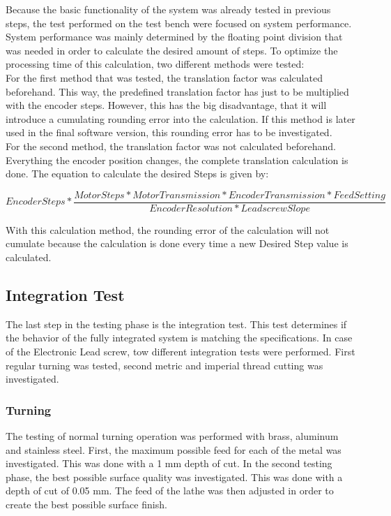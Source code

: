 Because the basic functionality of the system was already tested in previous steps, the test performed on the test bench were focused on system performance. System performance was mainly determined by the floating point division that was needed in order to calculate the desired amount of steps. To optimize the processing time of this calculation, two different methods were tested:\\
 
For the first method that was tested, the translation factor was calculated beforehand. This way, the predefined translation factor has just to be multiplied with the encoder steps. However, this has the big disadvantage, that it will introduce a cumulating rounding error into the calculation. If this method is later used in the final software version, this rounding error has to be investigated.\\
 
For the second method, the translation factor was not calculated beforehand. Everything the encoder position changes, the complete translation calculation is done. The equation to calculate the desired Steps is given by:
 
\begin{equation}
    Encoder Steps * \frac{ Motor Steps * Motor Transmission * Encoder Transmission * Feed Setting}{Encoder Resolution * Lead screw Slope}
\end{equation}
 
With this calculation method, the rounding error of the calculation will not cumulate because the calculation is done every time a new Desired Step value is calculated.
 
 
\subsection{Integration Test}
The last step in the testing phase is the integration test. This test determines if the behavior of the fully integrated system is matching the specifications. In case of the Electronic Lead screw, tow different integration tests were performed. First regular turning was tested, second metric and imperial thread cutting was investigated.
 
\subsubsection{Turning}
The testing of normal turning operation was performed with brass, aluminum and stainless steel. First, the maximum possible feed for each of the metal was investigated. This was done with a 1 mm depth of cut.
In the second testing phase, the best possible surface quality was investigated. This was done with a depth of cut of 0.05 mm. The feed of the lathe was then adjusted in order to create the best possible surface finish.
 
